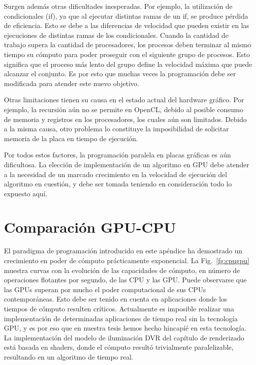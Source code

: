 Surgen además otras dificultades inesperadas.
Por ejemplo, la utilización de condicionales (if), ya que al ejecutar distintas ramas de un if, se produce pérdida de eficiencia.
Esto se debe a las diferencias de velocidad que pueden existir en las ejecuciones de distintas ramas de los condicionales.
Cuando la cantidad de trabajo supera la cantidad de procesadores, los procesos deben terminar al mismo tiempo su cómputo para poder proseguir con el siguiente grupo de procesos.
Esto significa que el proceso más lento del grupo define la velocidad máxima que puede alcanzar el conjunto.
Es por esto que muchas veces la programación debe ser modificada para atender este nuevo objetivo.

Otras limitaciones tienen su causa en el estado actual del hardware gráfico.
Por ejemplo, la recursión aún no se permite en OpenCL, debido al posible consumo de memoria y registros en los procesadores, los cuales aún son limitados.
Debido a la misma causa, otro problema lo constituye la imposibilidad de solicitar memoria de la placa en tiempo de ejecución.

Por todos estos factores, la programación paralela en placas gráficas es aún dificultosa.
La elección de implementación de un algoritmo en GPU debe atender a la necesidad de un marcado crecimiento en la velocidad de ejecución del algoritmo en cuestión, y debe ser tomada teniendo en consideración todo lo expuesto aquí.

\section{Comparación GPU-CPU}
El paradigma de programación introducido en este apéndice ha demostrado un crecimiento en poder de cómputo prácticamente exponencial.
La Fig.~\ref{fg:cpugpu} muestra curvas con la evolución de las capacidades de cómputo, en número de operaciones flotantes por segundo, de las CPU y las GPU.
Puede observarse que las GPUs superan por mucho el poder computacional de sus CPUs contemporáneas.
Esto debe ser tenido en cuenta en aplicaciones donde los tiempos de cómputo resulten críticos.
Actualmente es imposible realizar una implementación de determinadas aplicaciones de tiempo real sin la tecnología GPU, y es por eso que en nuestra tesis hemos hecho hincapíé en esta tecnología.
La implementación del modelo de iluminación DVR del capítulo de renderizado está basada en shaders, donde el cómputo resultó trivialmente paralelizable, resultando en un algoritmo de tiempo real.

